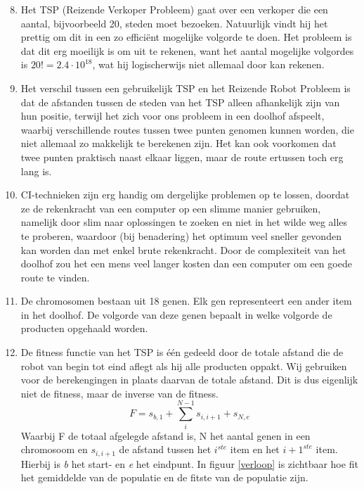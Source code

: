 \documentclass[a4paper,10pt,fleqn]{article}
\begin{document}
\begin{enumerate}[1.]
  \setcounter{enumi}{7}

    \item Het TSP (Reizende Verkoper Probleem) gaat over een verkoper die een aantal, bijvoorbeeld 20, steden moet bezoeken. Natuurlijk vindt hij het prettig om dit in een zo efficiënt mogelijke volgorde te doen. Het probleem is dat dit erg moeilijk is om uit te rekenen, want het aantal mogelijke volgordes is $ 20! = 2.4\cdot 10^{18}$, wat hij logischerwijs niet allemaal door kan rekenen.

    \item Het verschil tussen een gebruikelijk TSP en het Reizende Robot Probleem is dat de afstanden tussen de steden van het TSP alleen afhankelijk zijn van hun positie, terwijl het zich voor ons probleem in een doolhof afspeelt, waarbij verschillende routes tussen twee punten genomen kunnen worden, die niet allemaal zo makkelijk te berekenen zijn. Het kan ook voorkomen dat twee punten praktisch naast elkaar liggen, maar de route ertussen toch erg lang is.


    \item CI-technieken zijn erg handig om dergelijke problemen op te lossen, doordat ze de rekenkracht van een computer op een slimme manier gebruiken, namelijk door slim naar oplossingen te zoeken en niet in het wilde weg alles te proberen, waardoor (bij benadering) het optimum veel sneller gevonden kan worden dan met enkel brute rekenkracht.  Door de complexiteit van het doolhof zou het een mens veel langer kosten dan een computer om een goede route te vinden.

    \item De chromosomen bestaan uit 18 genen. Elk gen representeert een ander item in het doolhof. De volgorde van deze genen bepaalt in welke volgorde de producten opgehaald worden.

    \item De fitness functie van het TSP is één gedeeld door de totale afstand die de robot van begin tot eind aflegt als hij alle producten oppakt. Wij gebruiken voor de berekengingen  in plaats daarvan de totale afstand. Dit is dus eigenlijk niet de fitness, maar de inverse van de fitness.
    $$F = s_{b,1} + \sum_{i}^{N-1}s_{i,i+1} + s_{N,e}$$ Waarbij F de totaal afgelegde afstand is, N het aantal genen in een chromosoom en $s_{i,i+1}$ de afstand tussen het $i^{ste}$ item en het $i+1^{ste}$ item. Hierbij is \textit{b} het start- en \textit{e} het eindpunt. In figuur \ref{verloop} is zichtbaar hoe fit het gemiddelde van de populatie en de fitste van de populatie zijn.
\end{enumerate}
\end{document}

